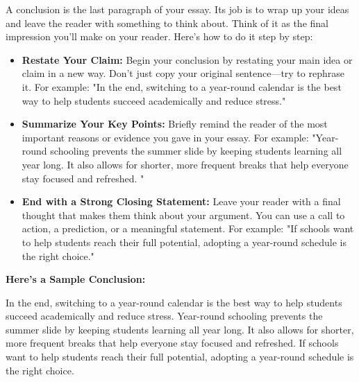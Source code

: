 \documentclass[12pt]{article}
\begin{document}
\begin{tcolorbox}[colframe=black!60, colback=white, 
coltitle=black, colbacktitle=black!15, fonttitle=\bfseries\Large, 
title=Example: How to Write a Conclusion, halign title=center, left=10pt, right=10pt, top=10pt, bottom=15pt]
A conclusion is the last paragraph of your essay. Its job is to wrap up your ideas and leave the reader with something to think about. Think of it as the final impression you’ll make on your reader.  Here’s how to do it step by step:

\begin{itemize}
    \item \textbf{Restate Your Claim:} Begin your conclusion by restating your main idea or claim in a new way. Don’t just copy your original sentence—try to rephrase it.   For example: "In the end, switching to a year-round calendar is the best way to help students succeed academically and reduce stress."
\end{itemize}
\begin{itemize}
    \item \textbf{Summarize Your Key Points:} Briefly remind the reader of the most important reasons or evidence you gave in your essay. For example: "Year-round schooling prevents the summer slide by keeping students learning all year long. It also allows for shorter, more frequent breaks that help everyone stay focused and refreshed. "
\end{itemize}
\begin{itemize}
    \item \textbf{End with a Strong Closing Statement:} Leave your reader with a final thought that makes them think about your argument. You can use a call to action, a prediction, or a meaningful statement. For example: "If schools want to help students reach their full potential, adopting a year-round schedule is the right choice."
\end{itemize}

\textbf{Here’s a Sample Conclusion:}

In the end, switching to a year-round calendar is the best way to help students succeed academically and reduce stress. Year-round schooling prevents the summer slide by keeping students learning all year long. It also allows for shorter, more frequent breaks that help everyone stay focused and refreshed. If schools want to help students reach their full potential, adopting a year-round schedule is the right choice. 
\end{tcolorbox}
\end{document}
